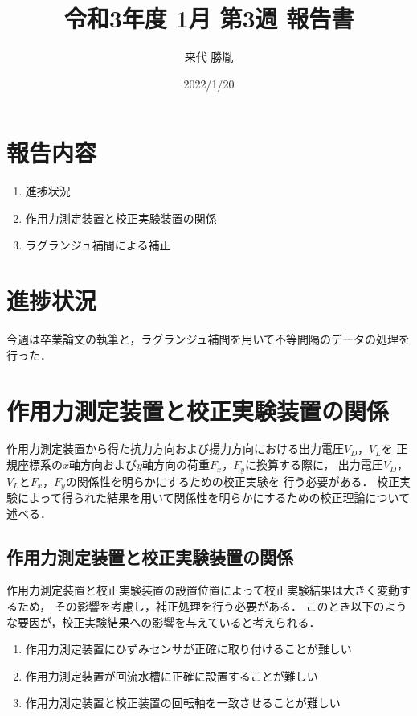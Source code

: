 \documentclass[twocolumn,a4j]{jsarticle}
\author{来代 勝胤}
\title{令和3年度 1月 第3週 報告書}
\date{2022/1/20}
\begin{document}
\columnseprule=0.1mm

\maketitle
\section*{報告内容}
\begin{enumerate}[1.]
    \item 進捗状況
    \item 作用力測定装置と校正実験装置の関係
    \item ラグランジュ補間による補正
\end{enumerate}

\section{進捗状況}
今週は卒業論文の執筆と，ラグランジュ補間を用いて不等間隔のデータの処理を行った．

\section{作用力測定装置と校正実験装置の関係}
作用力測定装置から得た抗力方向および揚力方向における出力電圧$V_D$，$V_L$を
正規座標系の$x$軸方向および$y$軸方向の荷重$F_x$，$F_y$に換算する際に，
出力電圧$V_D$，$V_L$と$F_x$，$F_y$の関係性を明らかにするための校正実験を
行う必要がある．
校正実験によって得られた結果を用いて関係性を明らかにするための校正理論について述べる．\\

\subsection{作用力測定装置と校正実験装置の関係}
作用力測定装置と校正実験装置の設置位置によって校正実験結果は大きく変動するため，
その影響を考慮し，補正処理を行う必要がある．
このとき以下のような要因が，校正実験結果への影響を与えていると考えられる．

\begin{enumerate}[(1)]
    \item 作用力測定装置にひずみセンサが正確に取り付けることが難しい
    \item 作用力測定装置が回流水槽に正確に設置することが難しい
    \item 作用力測定装置と校正装置の回転軸を一致させることが難しい
\end{enumerate}
\end{document}
